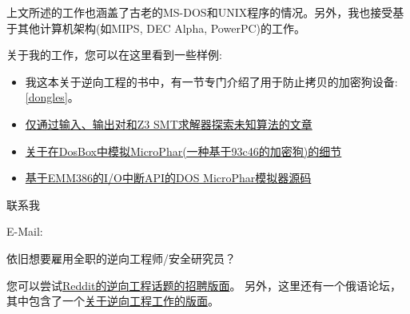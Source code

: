 上文所述的工作也涵盖了古老的MS-DOS和UNIX程序的情况。另外，我也接受基于其他计算机架构(如MIPS, DEC Alpha, PowerPC)的工作。

关于我的工作，您可以在这里看到一些样例:

\begin{itemize}
\item 我这本关于逆向工程的书中，有一节专门介绍了用于防止拷贝的加密狗设备: \ref{dongles}。
\item \href{http://yurichev.com/writings/z3_rockey.pdf}{仅通过输入、输出对和Z3 SMT求解器探索未知算法的文章}
\item \href{http://yurichev.com/blog/56/}{关于在DosBox中模拟MicroPhar(一种基于93c46的加密狗)的细节}
\item \href{http://conus.info/dongle/src/microph.asm}{基于EMM386的I/O中断API的DOS MicroPhar模拟器源码}
\end{itemize}

\large 联系我 \normalsize

E-Mail: \GTT{\EMAIL}

\large 依旧想要雇用全职的逆向工程师/安全研究员？ \normalsize

您可以尝试\href{https://www.reddit.com/r/ReverseEngineering/comments/49cza0/rreverseengineerings_2015_triannual_hiring_thread/}{Reddit的逆向工程话题的招聘版面}。
另外，这里还有一个俄语论坛，其中包含了一个\href{https://forum.reverse4you.org/forumdisplay.php?f=252}{关于逆向工程工作的版面}。

\vspace*{\fill}
\vfill

